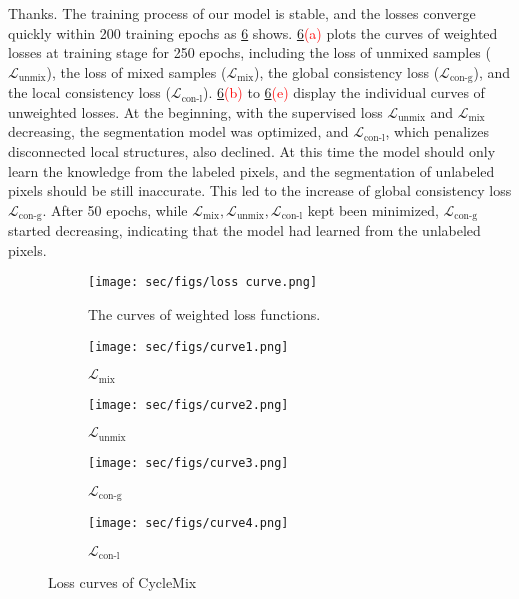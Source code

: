 \documentclass[10pt,twocolumn,letterpaper]{article}
\begin{document}
\newline{}
Thanks. 
The training process of our model is stable, and the losses converge quickly within 200 training epochs as \cref{fig:short} shows.
\cref{fig:short}\textcolor{red}{(a)} plots the curves of weighted losses at training stage for 250 epochs,
including the loss of unmixed samples ($\mathcal{L}_{\text{unmix}}$), the loss of mixed samples ($\mathcal{L}_{\text{mix}}$), the global consistency loss ($\mathcal{L}_{\text{con-g}}$), and the local consistency loss ($\mathcal{L}_{\text{con-l}}$).
\cref{fig:short}\textcolor{red}{(b)} to \cref{fig:short}\textcolor{red}{(e)} display the individual curves of unweighted losses.
At the beginning, with the supervised loss $\mathcal{L}_{\text{unmix}}$ and $\mathcal{L}_{\text{mix}}$ decreasing, the segmentation model was optimized, and $\mathcal{L}_{\text{con-l}}$, which penalizes disconnected local structures, also declined.
At this time the model should only learn the knowledge from the labeled pixels, and the segmentation of unlabeled pixels should be still inaccurate.
This led to the increase of global consistency loss $\mathcal{L}_{\text{con-g}}$.
After 50 epochs, while $\mathcal{L}_{\text{mix}},\mathcal{L}_{\text{unmix}},\mathcal{L}_{\text{con-l}}$ kept been minimized, $\mathcal{L}_{\text{con-g}}$ started decreasing, indicating that the model had learned from the unlabeled pixels. 
\begin{figure}[t!]
  \centering
  \begin{subfigure}[b]{0.95\linewidth}
         \texttt{[image: sec/figs/loss curve.png]}
         \caption{The curves of weighted loss functions.}
    \label{fig:short-a}
  \end{subfigure}
  \begin{subfigure}[b]{0.23\linewidth}
         \texttt{[image: sec/figs/curve1.png]}
         \caption{$\mathcal{L}_{\text{mix}}$}
    \label{fig:short-b}
  \end{subfigure}
    \begin{subfigure}[b]{0.21\linewidth}
         \texttt{[image: sec/figs/curve2.png]}
         \caption{$\mathcal{L}_{\text{unmix}}$}
    \label{fig:short-c}
  \end{subfigure}
    \begin{subfigure}[b]{0.21\linewidth}
         \texttt{[image: sec/figs/curve3.png]}
         \caption{$\mathcal{L}_{\text{con-g}}$}
    \label{fig:short-d}
  \end{subfigure}
    \begin{subfigure}[b]{0.21\linewidth}
         \texttt{[image: sec/figs/curve4.png]}
         \caption{$\mathcal{L}_{\text{con-l}}$}
    \label{fig:short-e}
  \end{subfigure}
  \caption{Loss curves of CycleMix}
  \label{fig:short}
\end{figure}



{\small


}
\end{document}
